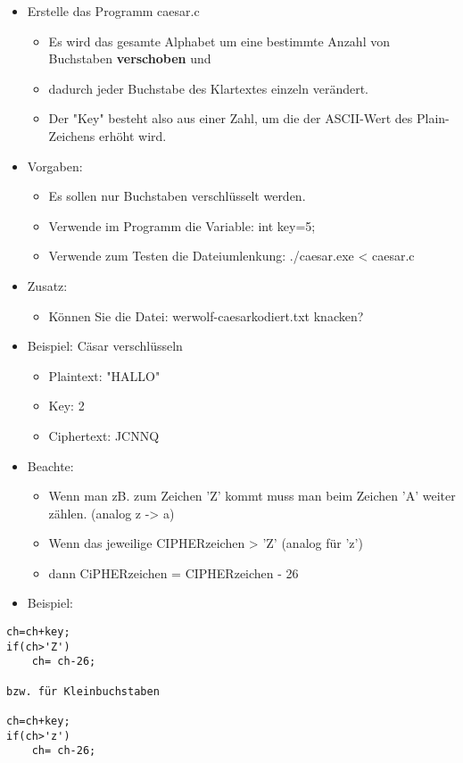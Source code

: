 \documentclass[11pt]{article}
\begin{document}
\begin{itemize}
\item Erstelle das Programm caesar.c
\begin{itemize}
\item Es wird das gesamte Alphabet um eine bestimmte Anzahl von Buchstaben \textbf{verschoben} und
\item dadurch jeder Buchstabe des Klartextes einzeln verändert.
\item Der "Key" besteht also aus einer Zahl, um die der ASCII-Wert des Plain-Zeichens erhöht wird.
\end{itemize}
\item Vorgaben:
\begin{itemize}
\item Es sollen nur Buchstaben verschlüsselt werden.
\item Verwende im Programm die Variable: int key=5;
\item Verwende zum Testen die Dateiumlenkung: ./caesar.exe < caesar.c
\end{itemize}
\item Zusatz:
\begin{itemize}
\item Können Sie die Datei: werwolf-caesarkodiert.txt knacken?
\end{itemize}

\item Beispiel: Cäsar verschlüsseln
\begin{itemize}
\item Plaintext: "HALLO"
\item Key: 2
\item Ciphertext: JCNNQ
\end{itemize}

\item Beachte:
\begin{itemize}
\item Wenn man zB. zum Zeichen 'Z' kommt muss man beim Zeichen 'A' weiter zählen. (analog z -> a)
\item Wenn das jeweilige CIPHERzeichen > 'Z' (analog für 'z')
\item dann CiPHERzeichen = CIPHERzeichen  - 26
\end{itemize}

\item Beispiel:
\end{itemize}
\lstset{language=C,label= ,caption= ,captionpos=b,numbers=none}
\begin{lstlisting}
ch=ch+key;
if(ch>'Z')
    ch= ch-26;

bzw. für Kleinbuchstaben

ch=ch+key;
if(ch>'z')
    ch= ch-26;
\end{lstlisting}
\end{document}
